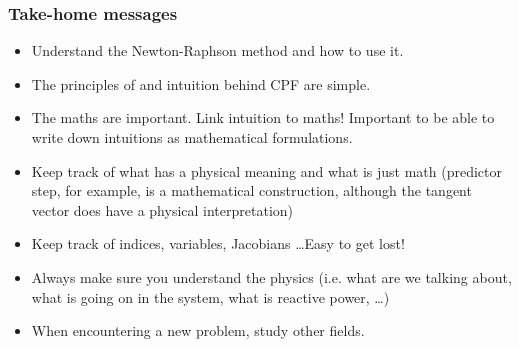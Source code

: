 \documentclass{beamer}
\begin{document}
\begin{frame}
  \frametitle{Take-home messages}
  \begin{itemize}
  \item Understand the Newton-Raphson method and how to use it.
  \item The principles of and intuition behind CPF are simple.
  \item The maths are important. Link intuition to maths! Important to be able to write down intuitions as mathematical formulations.
  \item Keep track of what has a physical meaning and what is just math (predictor step, for example, is a mathematical construction, although the tangent vector does have a physical interpretation)
  \item Keep track of indices, variables, Jacobians \ldots Easy to get lost!
  \item Always make sure you understand the physics (i.e. what are we talking about, what is going on in the system, what is reactive power, \ldots)
  \item When encountering a new problem, study other fields.
  \end{itemize}
\end{frame}
\end{document}

